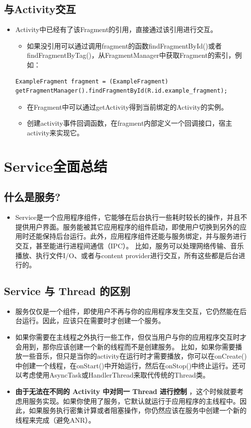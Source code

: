 \documentclass[9pt, b5paper]{article}
\begin{document}
\subsection{与Activity交互}
\label{sec-2-5}
\begin{itemize}
\item Activity中已经有了该Fragment的引用，直接通过该引用进行交互。
\begin{itemize}
\item 如果没引用可以通过调用fragment的函数findFragmentById()或者findFragmentByTag()，从FragmentManager中获取Fragment的索引，例如：
\end{itemize}
\begin{verbatim}
ExampleFragment fragment = (ExampleFragment) getFragmentManager().findFragmentById(R.id.example_fragment);
\end{verbatim}
\begin{itemize}
\item 在Fragment中可以通过getActivity得到当前绑定的Activity的实例。
\item 创建activity事件回调函数，在fragment内部定义一个回调接口，宿主activity来实现它。
\end{itemize}
\end{itemize}

\section{Service全面总结}
\label{sec-3}
\subsection{什么是服务?　　}
\label{sec-3-1}
\begin{itemize}
\item Service是一个应用程序组件，它能够在后台执行一些耗时较长的操作，并且不提供用户界面。服务能被其它应用程序的组件启动，即使用户切换到另外的应用时还能保持后台运行。此外，应用程序组件还能与服务绑定，并与服务进行交互，甚至能进行进程间通信（IPC）。 比如，服务可以处理网络传输、音乐播放、执行文件I/O、或者与content provider进行交互，所有这些都是后台进行的。
\end{itemize}
\subsection{Service 与 Thread 的区别}
\label{sec-3-2}
\begin{itemize}
\item 服务仅仅是一个组件，即使用户不再与你的应用程序发生交互，它仍然能在后台运行。因此，应该只在需要时才创建一个服务。
\item 如果你需要在主线程之外执行一些工作，但仅当用户与你的应用程序交互时才会用到，那你应该创建一个新的线程而不是创建服务。 比如，如果你需要播放一些音乐，但只是当你的activity在运行时才需要播放，你可以在onCreate()中创建一个线程，在onStart()中开始运行，然后在onStop()中终止运行。还可以考虑使用AsyncTask或HandlerThread来取代传统的Thread类。
\item \textbf{由于无法在不同的 Activity 中对同一 Thread 进行控制} ，这个时候就要考虑用服务实现。如果你使用了服务，它默认就运行于应用程序的主线程中。因此，如果服务执行密集计算或者阻塞操作，你仍然应该在服务中创建一个新的线程来完成（避免ANR）。
\end{itemize}
\end{document}
